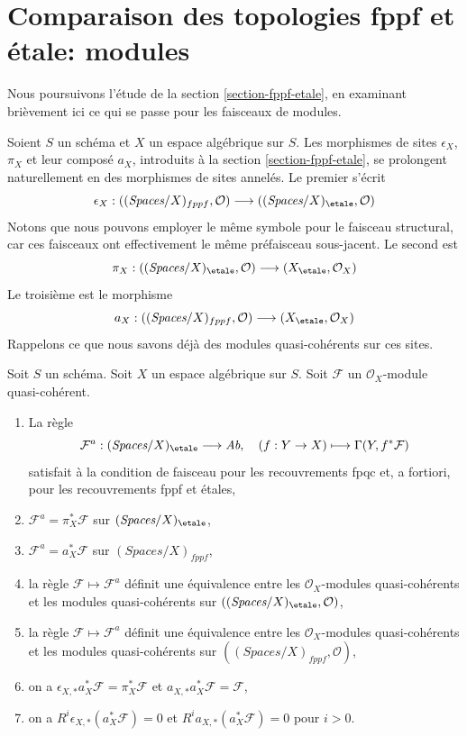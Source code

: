\section{Comparaison des topologies fppf et étale: modules}
\label{section-fppf-etale-modules}

\noindent
Nous poursuivons l'étude de la section \ref{section-fppf-etale}, en examinant
brièvement ici ce qui se passe pour les faisceaux de modules.

\medskip\noindent
Soient $S$ un schéma et $X$ un espace algébrique sur $S$.
Les morphismes de sites $\epsilon_X$, $\pi_X$ et leur composé $a_X$, introduits
à la section \ref{section-fppf-etale}, se prolongent naturellement en des
morphismes de sites annelés. Le premier s'écrit
$$
\epsilon_X :
((\textit{Spaces}/X)_{fppf}, \mathcal{O})
\longrightarrow
((\textit{Spaces}/X)_\etale, \mathcal{O})
$$
Notons que nous pouvons employer le même symbole pour le faisceau structural,
car ces faisceaux ont effectivement le même préfaisceau sous-jacent. Le second est
$$
\pi_X :
((\textit{Spaces}/X)_\etale, \mathcal{O})
\longrightarrow
(X_\etale, \mathcal{O}_X)
$$
Le troisième est le morphisme
$$
a_X :
((\textit{Spaces}/X)_{fppf}, \mathcal{O})
\longrightarrow
(X_\etale, \mathcal{O}_X)
$$
Rappelons ce que nous savons déjà des modules quasi-cohérents sur ces sites.

\begin{lemma}
\label{lemma-review-quasi-coherent}
Soit $S$ un schéma. Soit $X$ un espace algébrique sur $S$.
Soit $\mathcal{F}$ un $\mathcal{O}_X$-module quasi-cohérent.
\begin{enumerate}
\item La règle
$$
\mathcal{F}^a : (\textit{Spaces}/X)_\etale \longrightarrow \textit{Ab},\quad
(f : Y \to X) \longmapsto \Gamma(Y, f^*\mathcal{F})
$$
satisfait à la condition de faisceau pour les recouvrements fpqc et, a fortiori,
pour les recouvrements fppf et étales,
\item $\mathcal{F}^a = \pi_X^*\mathcal{F}$ sur $(\textit{Spaces}/X)_\etale$,
\item $\mathcal{F}^a = a_X^*\mathcal{F}$ sur $(\textit{Spaces}/X)_{fppf}$,
\item la règle $\mathcal{F} \mapsto \mathcal{F}^a$ définit une équivalence entre
les $\mathcal{O}_X$-modules quasi-cohérents et les modules quasi-cohérents sur
$((\textit{Spaces}/X)_\etale, \mathcal{O})$,
\item la règle $\mathcal{F} \mapsto \mathcal{F}^a$ définit une équivalence entre
les $\mathcal{O}_X$-modules quasi-cohérents et les modules quasi-cohérents sur
$((\textit{Spaces}/X)_{fppf}, \mathcal{O})$,
\item on a $\epsilon_{X, *}a_X^*\mathcal{F} = \pi_X^*\mathcal{F}$
et $a_{X, *}a_X^*\mathcal{F} = \mathcal{F}$,
\item on a $R^i\epsilon_{X, *}(a_X^*\mathcal{F}) = 0$
et $R^ia_{X, *}(a_X^*\mathcal{F}) = 0$ pour $i > 0$.
\end{enumerate}
\end{lemma}

